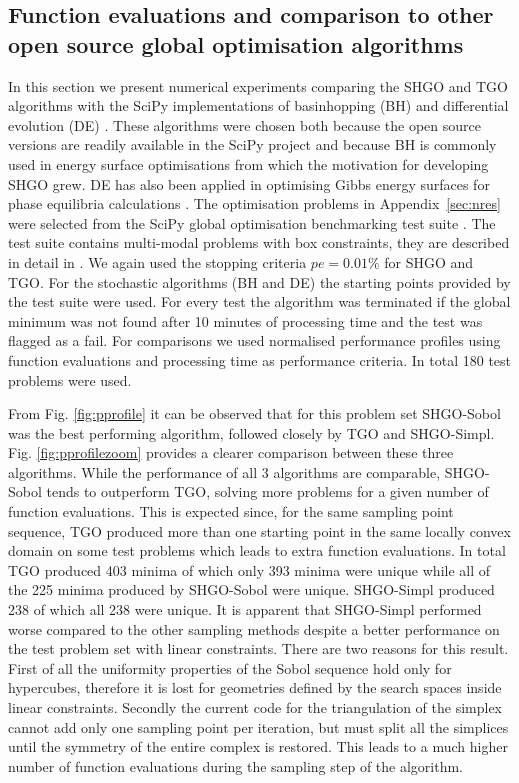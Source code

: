 \subsection{Function evaluations and comparison to other open source global optimisation algorithms}
In this section we present numerical experiments comparing the SHGO and TGO algorithms with the SciPy implementations \cite{scipy} of basinhopping (BH) \cite{li1987monte, wales2003energy, wales1997global, wales1999global} and differential evolution (DE) \cite{Storn1997}. These algorithms were chosen both because the open source versions are readily available in the SciPy project and because BH is commonly used in energy surface optimisations \cite{Wales2015} from which the motivation for developing SHGO grew. DE has also been applied in optimising Gibbs energy surfaces for phase equilibria calculations \cite{Zhang2011}. The optimisation problems in Appendix~\ref{sec:nres} were selected from the SciPy global optimisation benchmarking test suite \citep{Adorio2005, Gavana2016, Jamil2013, Mishra2007, Mishra2006, NIST2016}. The test suite contains multi-modal problems with box constraints, they are described in detail in \cite{Gavana2016}. We again used the stopping criteria $pe = 0.01\%$ for SHGO and TGO. For the stochastic algorithms (BH and DE) the starting points provided by the test suite were used. For every test the algorithm was terminated if the global minimum was not found after 10 minutes of processing time and the test was flagged as a fail. For comparisons we used normalised performance profiles \cite{Dolan2002} using function evaluations and processing time as performance criteria. In total 180 test problems were used.

From Fig. \ref{fig:pprofile} it can be observed that for this problem set SHGO-Sobol was the best performing algorithm, followed closely by TGO and SHGO-Simpl. Fig. \ref{fig:pprofilezoom} provides a clearer comparison between these three algorithms. While the performance of all 3 algorithms are comparable, SHGO-Sobol tends to outperform TGO, solving more problems for a given number of function evaluations. This is expected since, for the same sampling point sequence, TGO produced more than one starting point in the same locally convex domain on some test problems which leads to extra function evaluations. In total TGO produced 403 minima of which only 393 minima were unique while all of the 225 minima produced by SHGO-Sobol were unique. SHGO-Simpl produced 238 of which all 238 were unique. It is apparent that SHGO-Simpl performed worse compared to the other sampling methods despite a better performance on the test problem set with linear constraints. There are two reasons for this result. First of all the uniformity properties of the Sobol sequence hold only for hypercubes, therefore it is lost for geometries defined by the search spaces inside linear constraints. Secondly the current code for the triangulation of the simplex cannot add only one sampling point per iteration, but must split all the simplices until the symmetry of the entire complex is restored. This leads to a much higher number of function evaluations during the sampling step of the algorithm.

